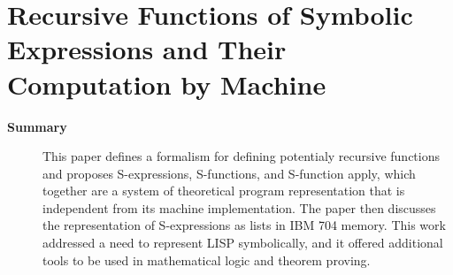 \section {Recursive Functions of Symbolic Expressions and Their Computation by Machine \cite{mccarthy1959recursive}}

\begin{description}
    \item[\textbf{Summary}]
        This paper defines a formalism for defining potentialy recursive functions and proposes S-expressions, S-functions, and S-function apply, which together are a system of theoretical program representation that is independent from its machine implementation.
        The paper then discusses the representation of S-expressions as lists in IBM 704 memory.
        This work addressed a need to represent LISP symbolically, and it offered additional tools to be used in mathematical logic and theorem proving.


\end{description}
